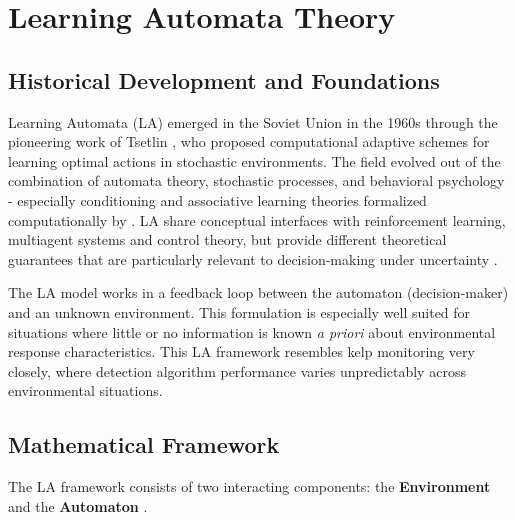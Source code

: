 \documentclass[12pt,oneside]{book}
\begin{document}
\section{Learning Automata Theory}
\label{sec:lit-la}

\subsection{Historical Development and Foundations}
\label{subsec:la-foundations}

Learning Automata (LA) emerged in the Soviet Union in the 1960s through the pioneering work of Tsetlin \citep{Tsetlin1961}, who proposed computational adaptive schemes for learning optimal actions in stochastic environments. The field evolved out of the combination of automata theory, stochastic processes, and behavioral psychology - especially conditioning and associative learning theories formalized computationally by \citet{BushMosteller1955}. LA share conceptual interfaces with reinforcement learning, multiagent systems and control theory, but provide different theoretical guarantees that are particularly relevant to decision-making under uncertainty \citep{Narendra1989, ThathacharSastry2002, Bisong2018}.

The LA model works in a feedback loop between the automaton (decision-maker) and an unknown environment. This formulation is especially well suited for situations where little or no information is known \textit{a priori} about environmental response characteristics. This LA framework resembles kelp monitoring very closely, where detection algorithm performance varies unpredictably across environmental situations.

\subsection{Mathematical Framework}
\label{subsec:la-math-framework}

The LA framework consists of two interacting components: the \textbf{Environment} and the \textbf{Automaton} \citep{Narendra1989, Bisong2018}.
\end{document}
